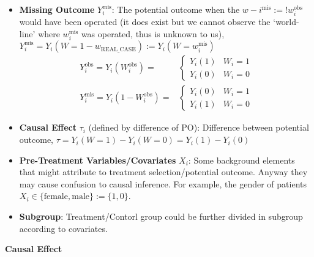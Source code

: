 \begin{itemize}[topsep=2pt,itemsep=0pt]
    \item \textbf{Missing Outcome} $ Y_i^{\mathrm{mis} } $: The potential outcome when the $ w-i^\mathrm{mis}:= !w_i^\mathrm{obs}  $ would have been operated (it does exist but we cannot observe the `world-line' where $ w^{\mathrm{mis} }_i $ was operated, thus is unknown to us), $ Y_i^{\mathrm{mis} }=Y_i(W=1-w_\mathrm{REAL\_CASE}):=Y_i(W=w_i^{\mathrm{mis} }) $ 
    \begin{align*}
        Y^\mathrm{obs} _i=Y_i(W_i^\mathrm{obs} )=&\begin{cases}
            Y_i(1)&W_i=1\\
            Y_i(0)&W_i=0
        \end{cases}\\
        Y^{\mathrm{mis} }_i=Y_i(1-W_i^\mathrm{obs} )=&\begin{cases}
            Y_i(0)&W_i=1\\
            Y_i(1)&W_i=0
        \end{cases}
    \end{align*}
    \item \textbf{Causal Effect} $ \tau_i $ (defined by difference of PO): Difference between potential outcome, $ \tau=Y_i(W=1)-Y_i(W=0)=Y_i(1)-Y_i(0) $
    \item \textbf{Pre-Treatment Variables/Covariates} $ X_i $: Some background elements that might attribute to treatment selection/potential outcome. Anyway they may cause confusion to causal inference. For example, the gender of patients $ X_i\in\{\mathrm{female}, \mathrm{male}  \}:=\{1,0\} $.
    \item \textbf{Subgroup}: Treatment/Contorl group could be further divided in subgroup according to covariates.
\end{itemize}


\begin{point}
    \textbf{Causal Effect}  
\end{point}

